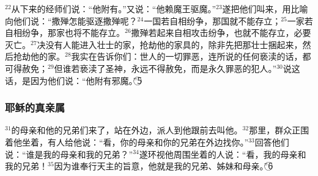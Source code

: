 $^{22}$从\UL[耶路撒冷]下来的经师们说：“他附有\UL[贝耳则步]。”又说：“他赖魔王驱魔。”$^{23}$\UL[耶稣]遂把他们叫来，用比喻向他们说：“撒殚怎能驱逐撒殚呢？$^{24}$一国若自相纷争，那国就不能存立；$^{25}$一家若自相纷争，那家也将不能存立。$^{26}$撒殚若起来自相攻击纷争，也就不能存立，必要灭亡。$^{27}$决没有人能进入壮士的家，抢劫他的家具的，除非先把那壮士捆起来，然后抢劫他的家。$^{28}$我实在告诉你们：世人的一切罪恶，连所说的任何亵渎的话，都可得赦免；$^{29}$但谁若亵渎了圣神，永远不得赦免，而是永久罪恶的犯人。”$^{30}$\UL[耶稣]说这话，是因为他们说：“他附有邪魔。”\textcircled{5}


\subsubsection{耶稣的真亲属}
$^{31}$\UL[耶稣]的母亲和他的兄弟们来了，站在外边，派人到他跟前去叫他。$^{32}$那里，群众正围着他坐着，有人给他说：“看，你的母亲和你的兄弟在外边找你。”$^{33}$\UL[耶稣]回答他们说：“谁是我的母亲和我的兄弟？”$^{34}$遂环视他周围坐着的人说：“看，我的母亲和我的兄弟！$^{35}$因为谁奉行天主的旨意，他就是我的兄弟、姊妹和母亲。”\textcircled{6}